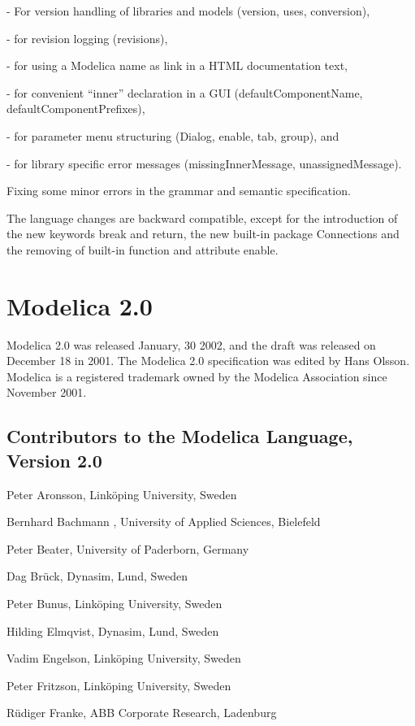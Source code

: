 \documentclass[10pt,a4paper]{report}
\def\doublelabel#1{\label{#1}\hypertarget{#1}{}}
\begin{document}
- For version handling of libraries and models (version, uses,
conversion),

- for revision logging (revisions),

- for using a Modelica name as link in a HTML documentation text,

- for convenient ``inner'' declaration in a GUI (defaultComponentName,
defaultComponentPrefixes),

- for parameter menu structuring (Dialog, enable, tab, group), and

- for library specific error messages (missingInnerMessage,
unassignedMessage).

Fixing some minor errors in the grammar and semantic specification.

The language changes are backward compatible, except for the
introduction of the new keywords break and return, the new built-in
package Connections and the removing of built-in function and attribute
enable.

\section{Modelica 2.0}\doublelabel{modelica-2-0}

Modelica 2.0 was released January, 30 2002, and the draft was released
on December 18 in 2001. The Modelica 2.0 specification was edited by
Hans Olsson. Modelica is a registered trademark owned by the Modelica
Association since November 2001.

\subsection{Contributors to the Modelica Language, Version 2.0}\doublelabel{contributors-to-the-modelica-language-version-2-0}

Peter Aronsson, Linköping University, Sweden

Bernhard Bachmann , University of Applied Sciences, Bielefeld

Peter Beater, University of Paderborn, Germany

Dag Brück, Dynasim, Lund, Sweden

Peter Bunus, Linköping University, Sweden

Hilding Elmqvist, Dynasim, Lund, Sweden

Vadim Engelson, Linköping University, Sweden

Peter Fritzson, Linköping University, Sweden

Rüdiger Franke, ABB Corporate Research, Ladenburg
\end{document}
